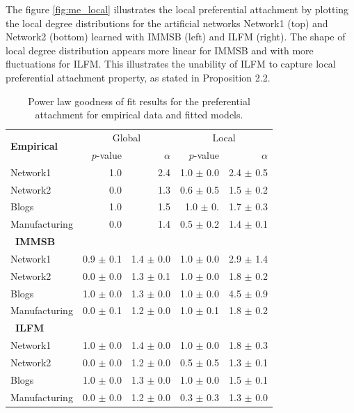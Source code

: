 The figure \ref{fig:me_local} illustrates the local preferential attachment by plotting the local degree distributions for the artificial networks Network1 (top) and Network2 (bottom) learned with IMMSB (left) and ILFM (right). The shape of local degree distribution appears more linear for IMMSB and with more fluctuations for ILFM. This illustrates the unability  of ILFM to capture local preferential attachment property,  as stated in Proposition 2.2. 
 

\begin{table}[t]
    \caption{Power law goodness of fit results for the preferential attachment for empirical data and fitted models.}
\centering
  \begin{tabular}{lrrrr}
      \multirow{2}{*}{\textbf{Empirical}}  &
      \multicolumn{2}{c}{Global} & \multicolumn{2}{c}{Local}\\
      \cmidrule(r){2-3} \cmidrule(l){4-5}
      &   $p$-value &   $\alpha$   & $p$-value & $\alpha$   \\
  	\hline
    Network1     &    1.0 &   2.4 & 1.0 $\pm$ 0.0  &  2.4 $\pm$ 0.5  \\
    Network2     &    0.0 &   1.3 & 0.6 $\pm$ 0.5  &  1.5 $\pm$ 0.2 \\
    Blogs         &    1.0 &   1.5 & 1.0 $\pm$ 0.   &  1.7 $\pm$ 0.3 \\
    Manufacturing &    0.0 &   1.4 & 0.5 $\pm$ 0.2  &  1.4 $\pm$ 0.1 \\
  	\hline

      \ \textbf{IMMSB} &&&& \\
  	\hline
    Network1     & 0.9 \(\pm\) 0.1   & 1.4 \(\pm\) 0.0 & 1.0 \(\pm\) 0.0   & 2.9 \(\pm\) 1.4 \\
    Network2     & 0.0 \(\pm\) 0.0   & 1.3 \(\pm\) 0.1 & 1.0 \(\pm\) 0.0   & 1.8 \(\pm\) 0.2 \\
    Blogs         & 1.0 \(\pm\) 0.0   & 1.3 \(\pm\) 0.0 & 1.0 \(\pm\) 0.0   & 4.5 \(\pm\) 0.9 \\
    Manufacturing & 0.0 \(\pm\) 0.1   & 1.2 \(\pm\) 0.0 & 1.0 \(\pm\) 0.1   & 1.8 \(\pm\) 0.2 \\
  	\hline

      \ \textbf{ILFM} &&&& \\
  	\hline
    Network1     & 1.0 \(\pm\) 0.0 & 1.4 \(\pm\) 0.0 & 1.0 \(\pm\) 0.0 & 1.8 \(\pm\) 0.3 \\
    Network2     & 0.0 \(\pm\) 0.0 & 1.2 \(\pm\) 0.0 & 0.5 \(\pm\) 0.5 & 1.3 \(\pm\) 0.1 \\
    Blogs         & 1.0 \(\pm\) 0.0 & 1.3 \(\pm\) 0.0 & 1.0 \(\pm\) 0.0 & 1.5 \(\pm\) 0.1 \\
    Manufacturing & 0.0 \(\pm\) 0.0 & 1.2 \(\pm\) 0.0 & 0.3 \(\pm\) 0.3 & 1.3 \(\pm\) 0.0 \\
  	\hline
  \end{tabular}
\label{table:me_gofit}
\end{table}

